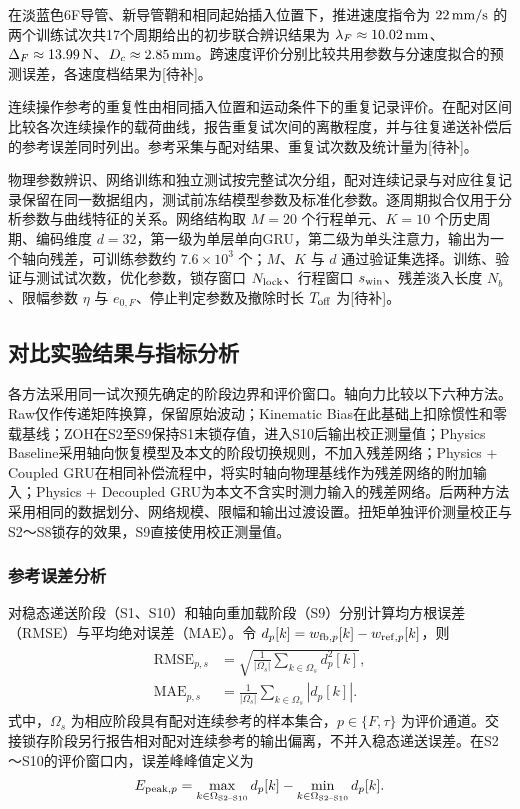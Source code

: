\documentclass{JQR_LaTeX_Template-0507/JQRnew}
\providecommand{\RevisionColor}{\color{black}}
\newcommand{\revbegin}{\begingroup\RevisionColor}
\newcommand{\revend}{\par\endgroup}
\begin{document}
在淡蓝色6F导管、新导管鞘和相同起始插入位置下，推进速度指令为 $22\,{\rm mm/s}$ 的两个训练试次共17个周期给出的初步联合辨识结果为 $\lambda_F\approx10.02\,{\rm mm}$、$\Delta_F\approx13.99\,{\rm N}$、$D_c\approx2.85\,{\rm mm}$。跨速度评价分别比较共用参数与分速度拟合的预测误差，各速度档结果为[待补]。

连续操作参考的重复性由相同插入位置和运动条件下的重复记录评价。在配对区间比较各次连续操作的载荷曲线，报告重复试次间的离散程度，并与往复递送补偿后的参考误差同时列出。参考采集与配对结果、重复试次数及统计量为[待补]。

物理参数辨识、网络训练和独立测试按完整试次分组，配对连续记录与对应往复记录保留在同一数据组内，测试前冻结模型参数及标准化参数。逐周期拟合仅用于分析参数与曲线特征的关系。网络结构取 $M=20$ 个行程单元、$K=10$ 个历史周期、编码维度 $d=32$，第一级为单层单向GRU，第二级为单头注意力，输出为一个轴向残差，可训练参数约 $7.6\times10^3$ 个；$M$、$K$ 与 $d$ 通过验证集选择。训练、验证与测试试次数，优化参数，锁存窗口 $N_{\rm lock}$、行程窗口 $s_{\rm win}$、残差淡入长度 $N_b$、限幅参数 $\eta$ 与 $e_{0,F}$、停止判定参数及撤除时长 $T_{\rm off}$ 为[待补]。

\subsection{对比实验结果与指标分析}

各方法采用同一试次预先确定的阶段边界和评价窗口。轴向力比较以下六种方法。Raw仅作传递矩阵换算，保留原始波动；Kinematic Bias在此基础上扣除惯性和零载基线；ZOH在S2至S9保持S1末锁存值，进入S10后输出校正测量值；Physics Baseline采用轴向恢复模型及本文的阶段切换规则，不加入残差网络；Physics + Coupled GRU在相同补偿流程中，将实时轴向物理基线作为残差网络的附加输入；Physics + Decoupled GRU为本文不含实时测力输入的残差网络。后两种方法采用相同的数据划分、网络规模、限幅和输出过渡设置。扭矩单独评价测量校正与S2～S8锁存的效果，S9直接使用校正测量值。

\subsubsection{参考误差分析}

\revbegin
对稳态递送阶段（S1、S10）和轴向重加载阶段（S9）分别计算均方根误差（RMSE）与平均绝对误差（MAE）。令 $d_p[k]=w_{{\rm fb},p}[k]-w_{{\rm ref},p}[k]$，则
\begin{align}
\label{eq:rmse-mae}
\begin{aligned}
\mathrm{RMSE}_{p,s}&=\sqrt{\frac{1}{|\Omega_s|}\sum_{k\in\Omega_s}d_p^2[k]},\\
\mathrm{MAE}_{p,s}&=\frac{1}{|\Omega_s|}\sum_{k\in\Omega_s}|d_p[k]|.
\end{aligned}
\end{align}
式中，$\Omega_s$ 为相应阶段具有配对连续参考的样本集合，$p\in\{F,\tau\}$ 为评价通道。交接锁存阶段另行报告相对配对连续参考的输出偏离，不并入稳态递送误差。在S2～S10的评价窗口内，误差峰峰值定义为
\begin{align}
\label{eq:peak-error}
E_{{\rm peak},p}=
\max_{k\in\Omega_{\rm S2\text{--}S10}}d_p[k]
-\min_{k\in\Omega_{\rm S2\text{--}S10}}d_p[k].
\end{align}
\revend
\end{document}
